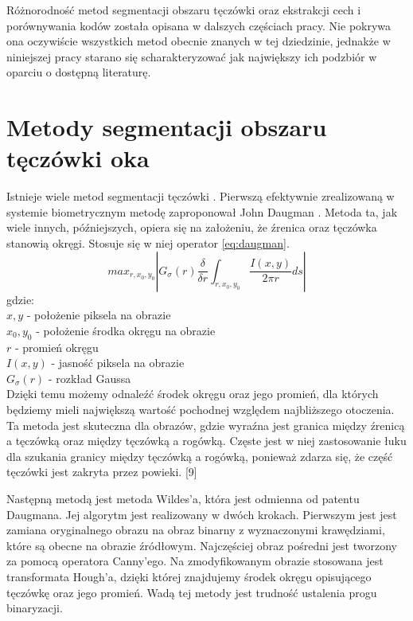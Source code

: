 	Różnorodność metod segmentacji obszaru tęczówki oraz ekstrakcji cech i porównywania kodów została opisana w dalszych częściach pracy. Nie pokrywa ona oczywiście wszystkich metod obecnie znanych w tej dziedzinie, jednakże w niniejszej pracy starano się scharakteryzować jak największy ich podzbiór w oparciu o dostępną literaturę.


\section{Metody segmentacji obszaru tęczówki oka}
\label{sec:segmentacja}

Istnieje wiele metod segmentacji tęczówki \cite{PrAl06}. Pierwszą efektywnie zrealizowaną w systemie biometrycznym metodę zaproponował John Daugman \cite{Daugman}. Metoda ta, jak wiele innych, późniejszych, opiera się na założeniu, że źrenica oraz tęczówka stanowią okręgi. Stosuje się w niej operator \ref{eq:daugman}.
\begin{equation}
\label{eq:daugman}
max_{r,x_{0},y_{0}}\left| G_{\sigma}(r) \frac{\delta}{\delta r}\int_{r,x_{0},y_{0}} \frac{I(x,y)}{2\pi r}ds \right|
\end{equation}
gdzie:\\
$ x,y $ - położenie piksela na obrazie \\
$ x_{0}, y_{0} $ - położenie środka okręgu na obrazie \\
$ r $ - promień okręgu \\
$ I(x,y) $ - jasność piksela na obrazie\\
$ G_{\sigma}(r) $ - rozkład Gaussa\\

Dzięki temu możemy odnaleźć środek okręgu oraz jego promień, dla których będziemy mieli największą wartość pochodnej względem najbliższego otoczenia. Ta metoda jest skuteczna dla obrazów, gdzie wyraźna jest granica między źrenicą a tęczówką oraz między tęczówką a rogówką. Częste jest w niej zastosowanie łuku dla szukania granicy między tęczówką a rogówką, ponieważ zdarza się, że część tęczówki jest zakryta przez powieki. [9]

Następną metodą jest metoda Wildes'a\cite{Wildes}, która jest odmienna od patentu Daugmana. Jej algorytm jest realizowany w dwóch krokach. Pierwszym jest jest zamiana oryginalnego obrazu na obraz binarny z wyznaczonymi krawędziami, które są obecne na obrazie źródłowym. Najczęściej obraz pośredni jest tworzony za pomocą operatora Canny'ego. Na zmodyfikowanym obrazie stosowana jest transformata Hough'a, dzięki której znajdujemy środek okręgu opisującego tęczówkę oraz jego promień. Wadą tej metody jest trudność ustalenia progu binaryzacji.

